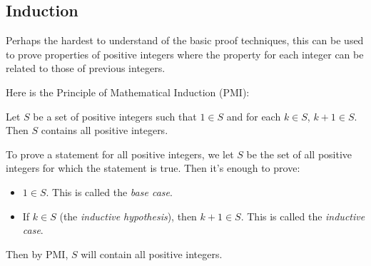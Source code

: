 \documentclass{amsart}
\begin{document}
\subsection{Induction}
Perhaps the hardest to understand of the basic proof techniques, this can be
used to prove properties of positive integers where the property for each
integer can be related to those of previous integers.

Here is the Principle of Mathematical Induction (PMI):
\begin{tcolorbox}
Let $S$ be a set of positive integers such that $1\in S$ and for each $k\in S$,
$k+1\in S$. Then $S$ contains all positive integers.
\end{tcolorbox}

To prove a statement for all positive integers, we let $S$ be the set of all
positive integers for which the statement is true. Then it's enough to prove:
\begin{itemize}
  \item $1\in S$. This is called the \emph{base case}.
  \item If $k\in S$ (the \emph{inductive hypothesis}), then $k+1\in S$. This is
    called the \emph{inductive case}.
\end{itemize}
Then by PMI, $S$ will contain all positive integers.
\end{document}
